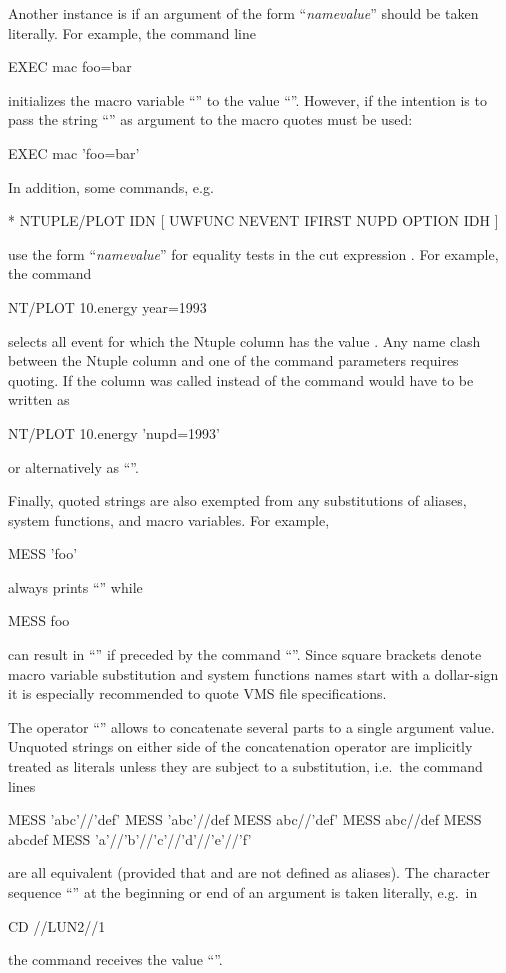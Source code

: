Another instance is if an argument of the form
``\textsl{name\Lit{=}value}'' should be taken literally.
For example, the command line
\begin{XMP}
EXEC mac foo=bar
\end{XMP}
initializes the macro variable ``'' to the
value ``''.
However, if the intention is to pass the string ``''
as argument to the macro quotes must be used:
\begin{XMP}
EXEC mac 'foo=bar'
\end{XMP}
In addition, some 
\ifPAWman\else\PAW{}\fi
commands, e.g.\
\begin{XMP}
 * NTUPLE/PLOT IDN [ UWFUNC NEVENT IFIRST NUPD OPTION IDH ]
\end{XMP}
use the form ``\textsl{name\Lit{=}value}'' for
equality tests in the cut expression .
For example, the command
\begin{XMP}
NT/PLOT 10.energy year=1993
\end{XMP}
selects all event for which the Ntuple column  has the
value \Lit{1993}.
Any name clash between the Ntuple column and one of the
command parameters requires quoting.
If the column was called  instead of  the
command would have to be written as
\begin{XMP}
NT/PLOT 10.energy 'nupd=1993'
\end{XMP}
or alternatively as ``''.

Finally, quoted strings are also exempted from any substitutions of
aliases, \KUIP{} system functions, and macro variables.
For example,
\begin{XMP}
MESS 'foo'
\end{XMP}
always prints ``'' while
\begin{XMP}
MESS foo
\end{XMP}
can result in ``'' if preceded by the command
``''.
Since square brackets denote macro variable substitution and system
functions names start with a dollar-sign it is especially recommended
to quote VMS file specifications.

The operator ``\Lit{//}'' allows to concatenate several parts to a
single argument value.
Unquoted strings on either side of the concatenation operator are
implicitly treated as literals unless they are subject to a
substitution, i.e.\ the command lines
\begin{XMP}
MESS 'abc'//'def'
MESS 'abc'//def
MESS abc//'def'
MESS abc//def
MESS abcdef
MESS 'a'//'b'//'c'//'d'//'e'//'f'
\end{XMP}
are all equivalent (provided that  and  are
not defined as aliases).
The character sequence ``\Lit{//}'' at the beginning or end of an
argument is taken literally, e.g.\ in
\begin{XMP}
CD //LUN2//1
\end{XMP}
the command receives the value ``''.


